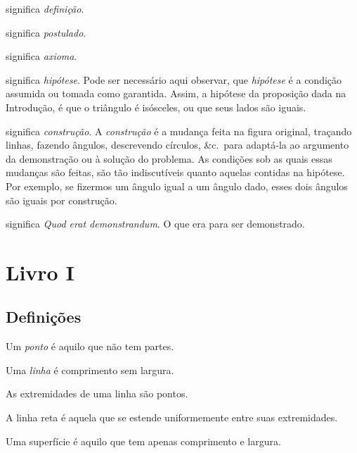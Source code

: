 \documentclass[booklanguage=brazilian]{byrnebook}
\begin{document}
\symb{\indefstr}
 significa \emph{definição}.

\symb{\inpoststr}
 significa \emph{postulado}.

\symb{\inaxstr}
 significa \emph{axioma}.

 significa \emph{hipótese}. Pode ser necessário aqui observar, que \emph{hipótese} é a condição assumida ou tomada como garantida. Assim, a hipótese da proposição dada na Introdução, é que o triângulo é isósceles, ou que seus lados são iguais.

\symb{\conststr}
 significa \emph{construção}. A \emph{construção} é a mudança feita na figura original, traçando linhas, fazendo ângulos, descrevendo círculos, \&c.\ para adaptá-la ao argumento da demonstração ou à solução do problema. As condições sob as quais essas mudanças são feitas, são tão indiscutíveis quanto aquelas contidas na hipótese. Por exemplo, se fizermos um ângulo igual a um ângulo dado, esses dois ângulos são iguais por construção.

\symb{\qedstr}
significa \emph{Quod erat demonstrandum}. O que era para ser demonstrado.

\part{Livro I}

\chapter*{Definições}

\startdefinition{}\label{def:I.I}
\begin{center}
Um \emph{ponto} é aquilo que não tem partes.
\end{center}

\startdefinition{}\label{def:I.II}
\begin{center}
Uma \emph{linha} é comprimento sem largura.
\end{center}

\startdefinition{}\label{def:I.III}
\begin{center}
As extremidades de uma linha são pontos.
\end{center}

\startdefinition{}\label{def:I.IV}
\begin{center}
A linha reta é aquela que se estende uniformemente entre suas extremidades.
\end{center}

\startdefinition{}\label{def:I.V}
\begin{center}
Uma superfície é aquilo que tem apenas comprimento e largura.
\end{center}
\end{document}

